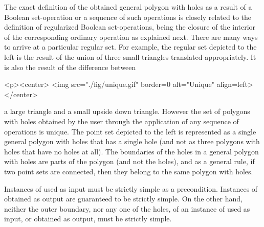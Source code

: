 The exact definition of the obtained general polygon with holes as a
result of a Boolean set-operation or a sequence of such operations is
closely related to the definition of regularized Boolean 
set-operations, being the closure of the interior of the corresponding
ordinary operation as explained next. There are many ways to arrive at a 
particular regular set. For example, the regular set depicted to the left 
is the result of the union of three small triangles translated 
appropriately. It is also the result of the difference between
\lcTex{%
  \setlength{\widthRight}{1.4cm}
  \setlength{\widthLeft}{\widthLineReal}
  \addtolength{\widthLeft}{-\widthRight}
  \begin{minipage}{\widthLeft}
}
\label{fig:unique}
\begin{ccHtmlOnly}
  <p><center>
    <img src="./fig/unique.gif" border=0 alt="Unique" align=left>
  </center>
\end{ccHtmlOnly}
a large
triangle and a small upside down triangle. However the set of polygons
with holes obtained by the user through the application of any sequence
of operations is unique. 
The point set depicted to the left is represented 
as a single general polygon with holes that has a single hole 
(and not as three polygons with holes that have no holes at all). The
boundaries of the holes in a general polygon with holes are parts of the 
polygon (and not the holes), and as a general rule, if two point sets are
connected, then they belong to the same polygon with holes.
 
Instances of  used as input must be strictly simple
as a precondition. Instances of  obtained as output
are guaranteed to be strictly simple. On the other hand, neither the outer
boundary, nor any one of the holes, of an instance of
 used as input, or obtained as output,
must be strictly simple.

